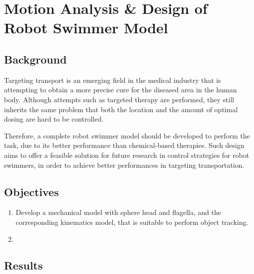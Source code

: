 \documentclass[12pt]{article}
\begin{document}
\newpage

\section{Motion Analysis \& Design of Robot Swimmer Model}


\subsection{Background}

Targeting transport is an emerging field in the medical industry that is attempting to obtain a more precise cure for the diseased area in the human body. Although attempts such as targeted therapy are performed, they still inherits the same problem that both the location and the amount of optimal dosing are hard to be controlled. 

Therefore, a complete robot swimmer model should be developed to perform the task, due to its better performance than chemical-based therapies. Such design aims to offer a feasible solution for future research in control strategies for robot swimmers, in order to achieve better performances in targeting transportation. 



\subsection{Objectives}

\begin{enumerate}
    
    \item {Develop a mechanical model with sphere head and flagella, and the corresponding kinematics model, that is suitable to perform object tracking.}
    \item {}
    
\end{enumerate}

\subsection{Results}
\end{document}
